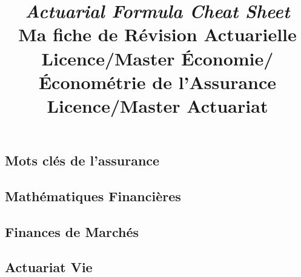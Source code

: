 \documentclass[french,a4paper]{article}
\title{
\author{}
\emph{Actuarial Formula Cheat Sheet}\\
Ma fiche de Révision Actuarielle\\\medskip\small
Licence/Master Économie/Économétrie de l'Assurance\\
Licence/Master Actuariat}
\theoremstyle{sansparenthese}
\begin{document}
\maketitle
%
 \setcounter{higher}{1}
\begin{center}

\end{center}
\newpage

\begin{center}
	\bigskip

\section*{Mots clés de l'assurance}
    \medskip
\end{center}


\begin{multicols}{2}
	

\end{multicols}

\newpage
\begin{center}
	\section*{Mathématiques Financières}
	\medskip
\end{center}


\begin{multicols}{2}
	
	
\end{multicols}

\newpage
\begin{center}
\section*{Finances de Marchés}
    \medskip
\end{center}

\begin{multicols}{2}


\end{multicols}

\newpage
\begin{center}
\section*{Actuariat Vie}
    \medskip
\end{center}

\begin{multicols}{2}
	

\end{multicols}
\end{document}
